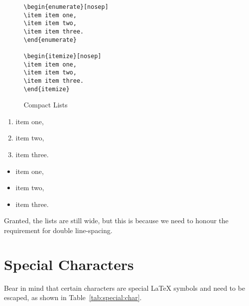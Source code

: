 \begin{figure}[htb!]
\begin{lstlisting}
\begin{enumerate}[nosep]
\item item one,
\item item two,
\item item three.
\end{enumerate}

\begin{itemize}[nosep]
\item item one,
\item item two,
\item item three.
\end{itemize}
\end{lstlisting}
\caption{Compact Lists}\label{fig:enumitem}
\end{figure}


\begin{enumerate}[nosep]
\item item one,
\item item two,
\item item three.
\end{enumerate}

\begin{itemize}[nosep]
\item item one,
\item item two,
\item item three.
\end{itemize}

Granted, the lists are still wide, but this is because we need to honour the requirement for double line-spacing.

\section{Special Characters}

Bear in mind that certain characters are special \LaTeX{} symbols and need to be escaped, as shown in Table~\ref{tab:special:char}.

